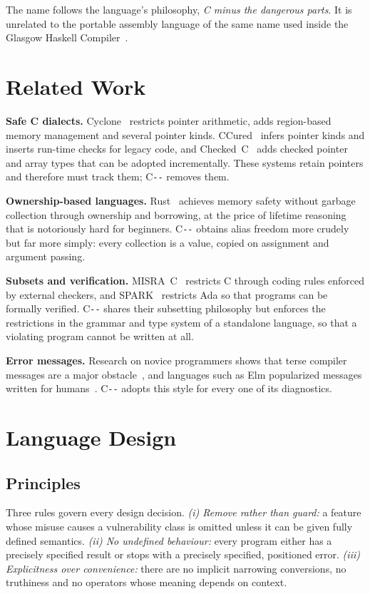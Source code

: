 \documentclass[conference]{IEEEtran}
\newcommand{\cmm}{C\texttt{-{}-}}
\begin{document}
The name follows the language's philosophy, \emph{C minus the dangerous parts}. It is unrelated to the
portable assembly language of the same name used inside the Glasgow Haskell Compiler~\cite{cmm_ghc}.

\section{Related Work}
\textbf{Safe C dialects.} Cyclone~\cite{cyclone} restricts pointer arithmetic, adds region-based memory
management and several pointer kinds. CCured~\cite{ccured} infers pointer kinds and inserts run-time checks
for legacy code, and Checked~C~\cite{checkedc} adds checked pointer and array types that can be adopted
incrementally. These systems retain pointers and therefore must track them; \cmm{} removes them.

\textbf{Ownership-based languages.} Rust~\cite{rust} achieves memory safety without garbage collection through
ownership and borrowing, at the price of lifetime reasoning that is notoriously hard for beginners. \cmm{}
obtains alias freedom more crudely but far more simply: every collection is a value, copied on assignment and
argument passing.

\textbf{Subsets and verification.} MISRA~C~\cite{misra} restricts C through coding rules enforced by external
checkers, and SPARK~\cite{spark} restricts Ada so that programs can be formally verified. \cmm{} shares their
subsetting philosophy but enforces the restrictions in the grammar and type system of a standalone language,
so that a violating program cannot be written at all.

\textbf{Error messages.} Research on novice programmers shows that terse compiler messages are a major
obstacle~\cite{becker2019}, and languages such as Elm popularized messages written for
humans~\cite{elm_errors}. \cmm{} adopts this style for every one of its diagnostics.

\section{Language Design}\label{sec:design}
\subsection{Principles}
Three rules govern every design decision. \emph{(i) Remove rather than guard:} a feature whose misuse causes a
vulnerability class is omitted unless it can be given fully defined semantics. \emph{(ii) No undefined
behaviour:} every program either has a precisely specified result or stops with a precisely specified,
positioned error. \emph{(iii) Explicitness over convenience:} there are no implicit narrowing conversions, no
truthiness and no operators whose meaning depends on context.
\end{document}
